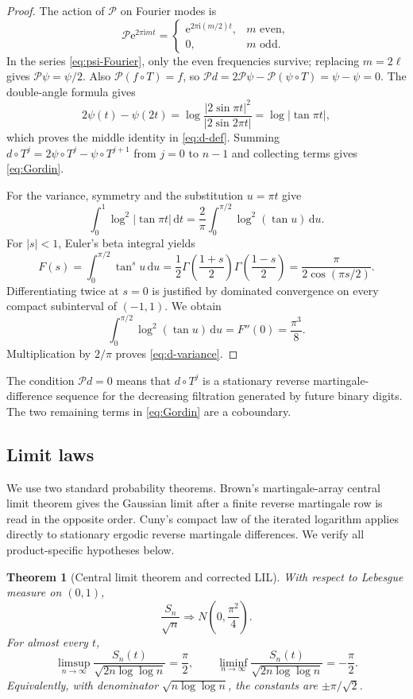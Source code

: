 \documentclass[11pt,oneside]{article}
\numberwithin{equation}{section}
\newtheorem{theorem}{Theorem}[section]
\theoremstyle{definition}
\theoremstyle{remark}
\newcommand{\e}{\mathrm e}
\newcommand{\ii}{\mathrm i}
\newcommand{\dd}{\,\mathrm d}
\newcommand{\abs}[1]{\left|#1\right|}
\newcommand{\Perron}{\mathcal P}
\begin{document}
\begin{proof}
The action of \(\Perron\) on Fourier modes is
\[
 \Perron\e^{2\pi\ii mt}
 =\begin{cases}
   \e^{2\pi\ii(m/2)t},&m\text{ even},\\
   0,&m\text{ odd}.
  \end{cases}
\]
In the series \eqref{eq:psi-Fourier}, only the even frequencies survive; replacing
\(m=2\ell\) gives \(\Perron\psi=\psi/2\).  Also
\(\Perron(f\circ T)=f\), so
\(\Perron d=2\Perron\psi-\Perron(\psi\circ T)=\psi-\psi=0\).
The double-angle formula gives
\[
 2\psi(t)-\psi(2t)
 =\log\frac{|2\sin\pi t|^2}{|2\sin2\pi t|}
 =\log\abs{\tan\pi t},
\]
which proves the middle identity in \eqref{eq:d-def}.  Summing
\(d\circ T^j=2\psi\circ T^j-\psi\circ T^{j+1}\) from \(j=0\) to \(n-1\) and collecting
terms gives \eqref{eq:Gordin}.

For the variance, symmetry and the substitution \(u=\pi t\) give
\[
 \int_0^1\log^2|\tan\pi t|\dd t
 =\frac2\pi\int_0^{\pi/2}\log^2(\tan u)\dd u.
\]
For \(|s|<1\), Euler's beta integral yields
\[
 F(s)=\int_0^{\pi/2}\tan^s u\dd u
 =\frac12\Gamma\!\left(\frac{1+s}{2}\right)
          \Gamma\!\left(\frac{1-s}{2}\right)
 =\frac{\pi}{2\cos(\pi s/2)}.
\]
Differentiating twice at \(s=0\) is justified by dominated convergence on every compact
subinterval of \((-1,1)\).  We obtain
\[
 \int_0^{\pi/2}\log^2(\tan u)\dd u=F''(0)=\frac{\pi^3}{8}.
\]
Multiplication by \(2/\pi\) proves \eqref{eq:d-variance}.
\end{proof}

The condition \(\Perron d=0\) means that \(d\circ T^j\) is a stationary reverse
martingale-difference sequence for the decreasing filtration generated by future binary
digits.  The two remaining terms in \eqref{eq:Gordin} are a coboundary.

\subsection{Limit laws}

We use two standard probability theorems.  Brown's martingale-array central limit theorem
\cite{brown} gives the Gaussian limit after a finite reverse martingale row is read in the
opposite order.  Cuny's compact law of the iterated logarithm \cite{cuny-lil} applies
directly to stationary ergodic reverse martingale differences.  We verify all
product-specific hypotheses below.

\begin{theorem}[Central limit theorem and corrected LIL]
\label{thm:clt-lil}
With respect to Lebesgue measure on \((0,1)\),
\begin{equation}
 \frac{S_n}{\sqrt n}\Longrightarrow N\!\left(0,\frac{\pi^2}{4}\right).
 \label{eq:CLT}
\end{equation}
For almost every \(t\),
\begin{equation}
 \limsup_{n\to\infty}\frac{S_n(t)}{\sqrt{2n\log\log n}}=\frac\pi2,
 \qquad
 \liminf_{n\to\infty}\frac{S_n(t)}{\sqrt{2n\log\log n}}=-\frac\pi2.
 \label{eq:LIL}
\end{equation}
Equivalently, with denominator \(\sqrt{n\log\log n}\), the constants are
\(\pm\pi/\sqrt2\).
\end{theorem}
\end{document}
